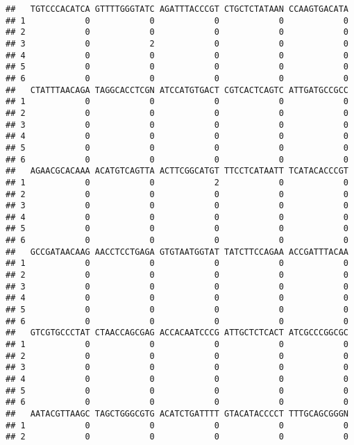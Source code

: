 \documentclass[]{article}
\begin{document}
\begin{verbatim}
##   TGTCCCACATCA GTTTTGGGTATC AGATTTACCCGT CTGCTCTATAAN CCAAGTGACATA
## 1            0            0            0            0            0
## 2            0            0            0            0            0
## 3            0            2            0            0            0
## 4            0            0            0            0            0
## 5            0            0            0            0            0
## 6            0            0            0            0            0
##   CTATTTAACAGA TAGGCACCTCGN ATCCATGTGACT CGTCACTCAGTC ATTGATGCCGCC
## 1            0            0            0            0            0
## 2            0            0            0            0            0
## 3            0            0            0            0            0
## 4            0            0            0            0            0
## 5            0            0            0            0            0
## 6            0            0            0            0            0
##   AGAACGCACAAA ACATGTCAGTTA ACTTCGGCATGT TTCCTCATAATT TCATACACCCGT
## 1            0            0            2            0            0
## 2            0            0            0            0            0
## 3            0            0            0            0            0
## 4            0            0            0            0            0
## 5            0            0            0            0            0
## 6            0            0            0            0            0
##   GCCGATAACAAG AACCTCCTGAGA GTGTAATGGTAT TATCTTCCAGAA ACCGATTTACAA
## 1            0            0            0            0            0
## 2            0            0            0            0            0
## 3            0            0            0            0            0
## 4            0            0            0            0            0
## 5            0            0            0            0            0
## 6            0            0            0            0            0
##   GTCGTGCCCTAT CTAACCAGCGAG ACCACAATCCCG ATTGCTCTCACT ATCGCCCGGCGC
## 1            0            0            0            0            0
## 2            0            0            0            0            0
## 3            0            0            0            0            0
## 4            0            0            0            0            0
## 5            0            0            0            0            0
## 6            0            0            0            0            0
##   AATACGTTAAGC TAGCTGGGCGTG ACATCTGATTTT GTACATACCCCT TTTGCAGCGGGN
## 1            0            0            0            0            0
## 2            0            0            0            0            0

\end{verbatim}
\end{document}
